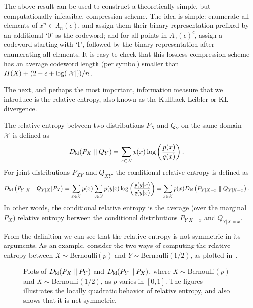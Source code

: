         \begin{remark}
            \label{remark:aep-1} The above result can be used to construct a theoretically simple, but computationally infeasible, compression scheme. The idea is simple: enumerate all elements of $x^n \in A_n(\epsilon)$,  and assign them their binary representation prefixed by an additional `$0$' as the codeword; and for all points in $A_n(\epsilon)^c$, assign a codeword starting with `$1$', followed by the binary representation after enumerating all elements. It is easy to check that this lossless compression scheme has an average codeword length (per symbol) smaller than $H(X) + (2+\epsilon + \log(|\mathcal{X}|))/n$.  
        \end{remark}

        The next, and perhaps the most important, information measure that we introduce is the relative entropy, also known as the Kullback-Leibler or KL divergence. 
        \begin{definition}
            \label{def:relativ-entropy}
            The relative entropy between two distributions $P_X$ and $Q_Y$ on the same domain $\mathcal{X}$ is defined as 
            \begin{align}
                D_{\text{kl}}(P_X \parallel Q_Y) = \sum_{x \in \mathcal{X}} p(x) \log \left( \frac{ p(x)}{q(x)} \right).  
            \end{align}
            For joint distributions $P_{XY}$ and $Q_{XY}$, the conditional relative entropy is defined as 
            \begin{align}
                D_{\text{kl}}\left(  P_{Y|X} \parallel Q_{Y|X} \vert P_X \right) = \sum_{x \in \mathcal{X}}p(x) \sum_{y \in \mathcal{Y}} p(y|x) \log \left( \frac{p(y|x)}{q(y|x)} \right) = \sum_{x \in \mathcal{X}} p(x) D_{\text{kl}}\left( P_{Y|X=x} \parallel Q_{Y|X=x} \right). 
            \end{align}
            In other words, the conditional relative entropy is the average (over the marginal $P_X$) relative entropy between the conditional distributions $P_{Y|X=x}$ and $Q_{Y|X=x}$. 
        \end{definition}
        From the definition we can see that the relative entropy is not symmetric in its arguments. As an example, consider the two ways of computing the  relative entropy between $X \sim \text{Bernoulli}(p)$ and $Y \sim \text{Bernoulli}(1/2)$, as plotted in~. 
        \begin{figure}
            \centering
            
            \caption{Plots of  $D_{\text{kl}}(P_X\parallel P_Y)$ and $D_{\text{kl}}(P_Y\parallel P_X)$, where $X \sim \text{Bernoulli}(p)$ and $X \sim \text{Bernoulli}(1/2)$, as $p$ varies in $[0,1]$. The figures illustrates the locally quadratic behavior of relative entropy, and also shows that it is not symmetric.}
            \label{fig:binary-kl}
        \end{figure}
        
